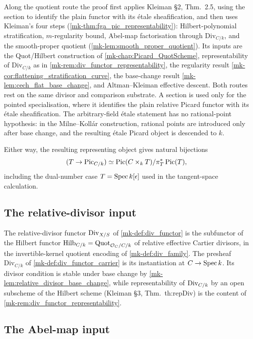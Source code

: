 Along the quotient route the proof first applies Kleiman \S 2, Thm.~2.5, using
the section to identify the plain functor with its \'etale sheafification, and
then uses Kleiman's four steps
(\ref{mk-thm:fga_pic_representability}): Hilbert-polynomial stratification,
\(m\)-regularity bound, Abel-map factorisation through
\(\mathrm{Div}_{C/k}\), and the smooth-proper quotient
(\ref{mk-lem:smooth_proper_quotient}). Its inputs are the Quot/Hilbert
construction of \ref{mk-chap:Picard_QuotScheme}, representability of
\(\mathrm{Div}_{C/k}\) as in \ref{mk-rem:div_functor_representability}, the
regularity result \ref{mk-cor:flattening_stratification_curve}, the base-change
result \ref{mk-lem:cech_flat_base_change}, and Altman--Kleiman effective descent.
Both routes rest on the same divisor and comparison substrate. A section is
used only for the pointed specialisation, where it identifies the plain
relative Picard functor with its \'etale sheafification. The arbitrary-field
\'etale statement has no rational-point hypothesis: in the Milne--Koll\'ar
construction, rational points are introduced only after base change, and the
resulting \'etale Picard object is descended to \(k\).

Either way, the resulting representing object gives
natural bijections
\[
  (T\to\operatorname{Pic}_{C/k})\simeq
  \operatorname{Pic}(C\times_kT)/\pi_T^*\operatorname{Pic}(T),
\]
including the dual-number case \(T=\operatorname{Spec} k[\epsilon]\) used in the
tangent-space calculation.

\subsection{The relative-divisor input}
\label{mk-subsec:sorry_has_div_functor}

The relative-divisor functor \(\operatorname{Div}_{X/S}\) of
\ref{mk-def:div_functor} is the subfunctor of the Hilbert functor
\(\operatorname{Hilb}_{C/k} = \operatorname{Quot}_{\mathcal{O}_C/C/k}\) of relative effective Cartier
divisors, in the invertible-kernel quotient encoding of
\ref{mk-def:div_family}. The presheaf \(\mathrm{Div}_{C/k}\) of
\ref{mk-def:div_functor_carrier} is its instantiation at
\(C\to\operatorname{Spec} k\). Its divisor condition is stable under base change by
\ref{mk-lem:relative_divisor_base_change}, while representability of
\(\operatorname{Div}_{C/k}\) by an open subscheme of the Hilbert scheme (Kleiman \S 3,
Thm.~th:repDiv) is the content of
\ref{mk-rem:div_functor_representability}.

\subsection{The Abel-map input}
\label{mk-subsec:sorry_has_abel_map}

